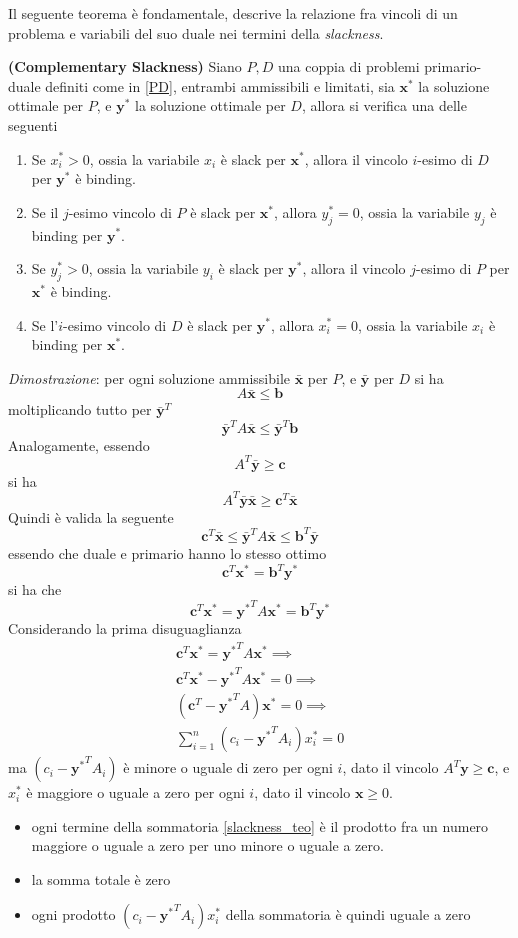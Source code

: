 \documentclass[10pt, letterpaper]{report}
\newcommand{\bb}{{\mathbf{b}}}
\newcommand{\bc}{{\mathbf{c}}}
\newcommand{\x}{{\mathbf{x}}}
\newcommand{\y}{{\mathbf{y}}}
\begin{document}
Il seguente teorema è fondamentale, descrive la relazione fra vincoli di un problema e variabili del suo duale nei termini della \textit{slackness}.
\begin{teorema}\label{complementary_slackness}
    \textbf{(Complementary Slackness)} Siano $P,D$ una coppia di problemi primario-duale definiti come in \ref{PD}, entrambi ammissibili e limitati, sia $\x^*$ la soluzione ottimale per $P$, e $\y^*$ la soluzione ottimale per $D$, allora si verifica una delle seguenti\begin{enumerate}
        \item Se $x^*_i>0$, ossia la variabile $x_i$ è slack per $\x^*$, allora il vincolo $i$-esimo di $D$ per $\y^*$ è binding.
        \item Se il $j$-esimo vincolo di $P$ è slack per $\x^*$, allora $y^*_j=0$, ossia
        la variabile $y_j$ è binding per $\y^*$.
        \item Se $y^*_j>0$, ossia la variabile $y_i$ è slack per $\y^*$, allora il vincolo $j$-esimo di $P$ per $\x^*$ è binding.
        \item Se l'$i$-esimo vincolo di $D$ è slack per $\y^*$, allora $x^*_i=0$, ossia
        la variabile $x_i$ è binding per $\x^*$.
    \end{enumerate}
\end{teorema}
\textit{Dimostrazione}: per ogni soluzione ammissibile $\bar\x$ per $P$, e $\bar\y$ per $D$ si ha 
$$ A\bar\x\le \bb$$
moltiplicando tutto per $\bar\y^T$
$$ \bar\y^TA\bar\x\le \bar\y^T\bb$$
Analogamente, essendo 
$$ A^T\bar\y\ge \bc$$
si ha 
$$ A^T\bar\y\bar\x\ge \bc^T\bar\x$$
Quindi è valida la seguente\begin{equation}
    \bc^T\bar\x\le\bar\y^TA\bar\x\le\bb^T\bar\y
\end{equation}
essendo che duale e primario hanno lo stesso ottimo 
$$ \bc^T\x^*=\bb^T\y^*$$
si ha che 
\begin{equation}
     \bc^T\x^*={\y^*}^TA\x^*=\bb^T\y^*
\end{equation}
Considerando la prima disuguaglianza \begin{eqnarray}
     \bc^T\x^*={\y^*}^TA\x^*\implies \\
      \bc^T\x^*-{\y^*}^TA\x^*=0\implies \\
      (\bc^T-{\y^*}^TA)\x^*=0 \implies \\ \label{slackness_teo}
      \sum_{i=1}^n(c_i-{\y^*}^TA_i)x^*_i=0
\end{eqnarray}
ma $(c_i-{\y^*}^TA_i)$ è minore o uguale di zero per ogni $i$, dato il vincolo $A^T\y\ge\bc$, e $x_i^*$ è maggiore o uguale a zero per ogni $i$, dato il vincolo $\x\ge 0$.\begin{itemize}
    \item ogni termine della sommatoria \ref{slackness_teo} è il prodotto fra un numero maggiore o uguale a zero per uno minore o uguale a zero.
    \item la somma totale è zero 
    \item ogni prodotto $(c_i-{\y^*}^TA_i)x^*_i$ della sommatoria è quindi uguale a zero
\end{itemize}
\end{document}
